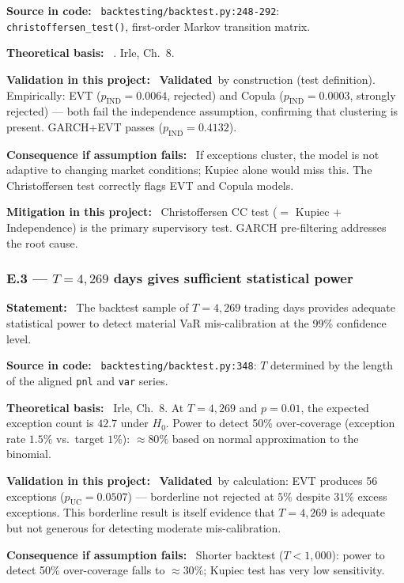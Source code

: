 \documentclass[11pt,a4paper]{article}
\newcommand{\asmfield}[1]{\medskip\noindent\textbf{#1:}\ }
\newcommand{\code}[1]{\texttt{#1}}
\newcommand{\validated}{\textbf{Validated}}
\begin{document}
\asmfield{Source in code}
\code{backtesting/backtest.py:248-292}: \code{christoffersen\_test()},
first-order Markov transition matrix.

\asmfield{Theoretical basis}
\cite{Christoffersen1998}. Irle, Ch.~8.

\asmfield{Validation in this project}
\validated\ by construction (test definition). Empirically: EVT
($p_{\mathrm{IND}} = 0.0064$, rejected) and Copula ($p_{\mathrm{IND}} = 0.0003$,
strongly rejected) --- both fail the independence assumption, confirming
that clustering is present. GARCH+EVT passes ($p_{\mathrm{IND}} = 0.4132$).

\asmfield{Consequence if assumption fails}
If exceptions cluster, the model is not adaptive to changing market conditions;
Kupiec alone would miss this. The Christoffersen test correctly flags EVT
and Copula models.

\asmfield{Mitigation in this project}
Christoffersen CC test ($= $ Kupiec $+$ Independence) is the primary
supervisory test. GARCH pre-filtering addresses the root cause.

\subsubsection{E.3 --- $T = 4{,}269$ days gives sufficient statistical power}\label{asm:E3}

\asmfield{Statement}
The backtest sample of $T = 4{,}269$ trading days provides adequate
statistical power to detect material VaR mis-calibration at the 99\%
confidence level.

\asmfield{Source in code}
\code{backtesting/backtest.py:348}: $T$ determined by the length of the
aligned \code{pnl} and \code{var} series.

\asmfield{Theoretical basis}
Irle, Ch.~8. At $T = 4{,}269$ and $p = 0.01$, the expected exception count
is $42.7$ under $H_0$. Power to detect 50\% over-coverage (exception rate
$1.5\%$ vs.\ target $1\%$): $\approx 80\%$ based on normal approximation
to the binomial.

\asmfield{Validation in this project}
\validated\ by calculation: EVT produces 56 exceptions ($p_{\mathrm{UC}}
= 0.0507$) --- borderline not rejected at $5\%$ despite $31\%$ excess
exceptions. This borderline result is itself evidence that $T = 4{,}269$
is adequate but not generous for detecting moderate mis-calibration.

\asmfield{Consequence if assumption fails}
Shorter backtest ($T < 1{,}000$): power to detect 50\% over-coverage falls
to $\approx 30\%$; Kupiec test has very low sensitivity.
\end{document}
